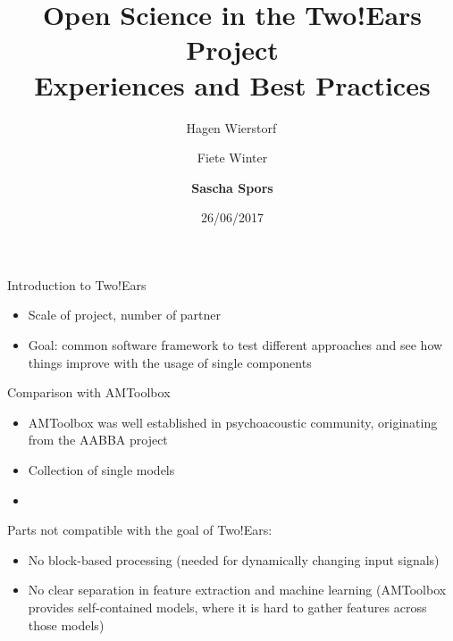 \documentclass{beamer}
\begin{document}
\title{\centering Open Science in the Two!Ears Project \\ Experiences and Best Practices}
\author{Hagen Wierstorf$\,$ \and
        Fiete Winter \and
        \textbf{Sascha Spors}}
\date{26/06/2017}
\maketitle

\begin{frame}{Introduction to Two!Ears}

    \begin{itemize}
        \item Scale of project, number of partner
        \item Goal: common software framework to test different approaches and
            see how things improve with the usage of single components
    \end{itemize}

\end{frame}

\begin{frame}{Comparison with AMToolbox}

    \begin{itemize}
        \item AMToolbox was well established in psychoacoustic community,
            originating from the AABBA project
        \item Collection of single models
        \item 
    \end{itemize}

    Parts not compatible with the goal of Two!Ears:
    \begin{itemize}
        \item No block-based processing (needed for dynamically changing input
            signals)
        \item No clear separation in feature extraction and machine learning
            (AMToolbox provides self-contained models, where it is hard to
            gather features across those models)
    \end{itemize}

\end{frame}
\end{document}
